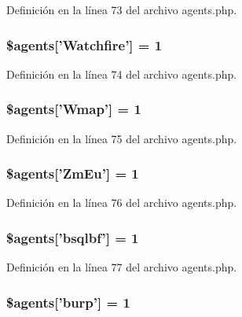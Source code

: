 Definición en la línea 73 del archivo agents.\-php.

\hypertarget{agents_8php_a461fd695dd6d0661782e47c316df5168}{
\subsubsection[{\$agents}]{\setlength{\rightskip}{0pt plus 5cm}\$agents\mbox{[}'Watchfire'\mbox{]} = 1}}\label{agents_8php_a461fd695dd6d0661782e47c316df5168}


Definición en la línea 74 del archivo agents.\-php.

\hypertarget{agents_8php_ad61070b8062e8f841eabf3e364023f91}{
\subsubsection[{\$agents}]{\setlength{\rightskip}{0pt plus 5cm}\$agents\mbox{[}'Wmap'\mbox{]} = 1}}\label{agents_8php_ad61070b8062e8f841eabf3e364023f91}


Definición en la línea 75 del archivo agents.\-php.

\hypertarget{agents_8php_a8022879ffea5e363617b4c4141466c6f}{
\subsubsection[{\$agents}]{\setlength{\rightskip}{0pt plus 5cm}\$agents\mbox{[}'Zm\-Eu'\mbox{]} = 1}}\label{agents_8php_a8022879ffea5e363617b4c4141466c6f}


Definición en la línea 76 del archivo agents.\-php.

\hypertarget{agents_8php_ab434a6415852b9359d21d91dc58d00e9}{
\subsubsection[{\$agents}]{\setlength{\rightskip}{0pt plus 5cm}\$agents\mbox{[}'bsqlbf'\mbox{]} = 1}}\label{agents_8php_ab434a6415852b9359d21d91dc58d00e9}


Definición en la línea 77 del archivo agents.\-php.

\hypertarget{agents_8php_a2b0d1a432fa260dbfa17d842d866e080}{
\subsubsection[{\$agents}]{\setlength{\rightskip}{0pt plus 5cm}\$agents\mbox{[}'burp'\mbox{]} = 1}}\label{agents_8php_a2b0d1a432fa260dbfa17d842d866e080}


